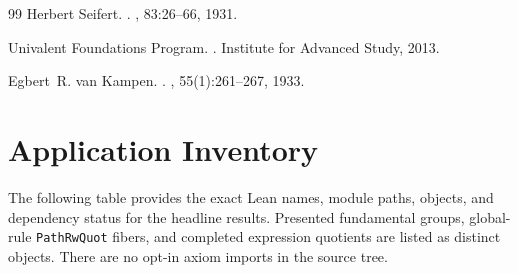 \documentclass{lmcs}
\theoremstyle{definition}
\theoremstyle{plain}
\theoremstyle{remark}
\begin{document}
\begin{thebibliography}{99}
Herbert Seifert.
.
, 83:26--66, 1931.

{Univalent Foundations Program}.
.
\newblock Institute for Advanced Study, 2013.

Egbert~R. van Kampen.
.
, 55(1):261--267, 1933.

\end{thebibliography}

\clearpage
\appendix
\section{Application Inventory}
\label{app:inventory}

The following table provides the exact Lean names, module paths, objects, and
dependency status for the headline results.  Presented fundamental groups,
global-rule \texttt{PathRwQuot} fibers, and completed expression quotients are
listed as distinct objects.  There are no opt-in axiom imports in the source
tree.
\end{document}
